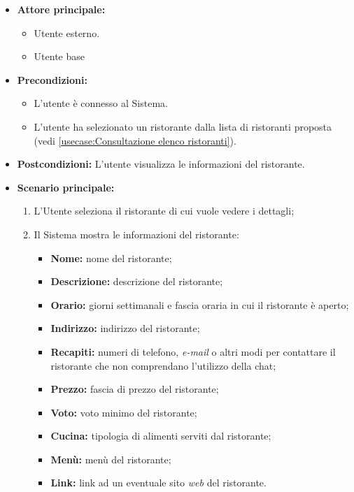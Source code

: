 \label{usecase:Visualizzazione di un ristorante}
\begin{itemize}
	\item \textbf{Attore principale:}    
	\begin{itemize}
        \item Utente esterno.
        \item Utente base
    \end{itemize}

	\item \textbf{Precondizioni:}
	\begin{itemize}
        \item L'utente è connesso al Sistema.
        \item L'utente ha selezionato un ristorante dalla lista di ristoranti proposta (vedi \autoref{usecase:Consultazione elenco ristoranti}).
    \end{itemize}

	\item \textbf{Postcondizioni:} L'utente visualizza le informazioni del ristorante.

	\item \textbf{Scenario principale:}
		\begin{enumerate}
		    \item L'Utente seleziona il ristorante di cui vuole vedere i dettagli;
		    \item Il Sistema mostra le informazioni del ristorante:
		    \begin{itemize}
				\item \textbf{Nome:} nome del ristorante;
				\item \textbf{Descrizione:} descrizione del ristorante;
				\item \textbf{Orario:} giorni settimanali e fascia oraria in cui il ristorante è aperto;
				\item \textbf{Indirizzo:} indirizzo del ristorante;
				\item \textbf{Recapiti:} numeri di telefono, \textit{e-mail} o altri modi per contattare il ristorante che non comprendano l'utilizzo della chat;
				\item \textbf{Prezzo:} fascia di prezzo del ristorante;
				\item \textbf{Voto:} voto minimo del ristorante;
				\item \textbf{Cucina:} tipologia di alimenti serviti dal ristorante;
				\item \textbf{Menù:} menù del ristorante;
				\item \textbf{Link:} link ad un eventuale sito \textit{web} del ristorante. 
			\end{itemize}
	    \end{enumerate}

\end{itemize}
